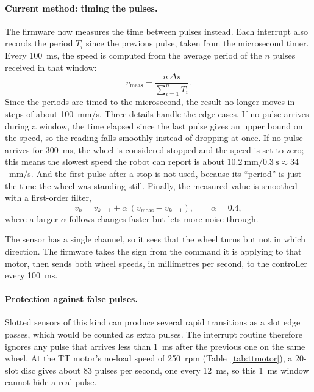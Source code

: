 \paragraph{Current method: timing the pulses.} The firmware now measures the time between
pulses instead. Each interrupt also records the period \(T_i\) since the previous pulse,
taken from the microsecond timer. Every 100~ms, the speed is computed from the average
period of the \(n\) pulses received in that window:
\begin{equation}
  v_{\text{meas}} = \frac{n \, \Delta s}{\sum_{i=1}^{n} T_i}.
\end{equation}
Since the periods are timed to the microsecond, the result no longer moves in steps of
about 100~mm/s. Three details handle the edge cases. If no pulse arrives during a window, the
time elapsed since the last pulse gives an upper bound on the speed, so the reading falls
smoothly instead of dropping at once. If no pulse arrives for 300~ms, the wheel is
considered stopped and the speed is set to zero; this means the slowest speed the robot
can report is about \(10.2~\text{mm} / 0.3~\text{s} \approx 34\)~mm/s. And the first
pulse after a stop is not used, because its ``period'' is just the time the wheel was
standing still. Finally, the measured value is smoothed with a first-order filter,
\begin{equation}
  v_k = v_{k-1} + \alpha \,(v_{\text{meas}} - v_{k-1}), \qquad \alpha = 0.4,
\end{equation}
where a larger \(\alpha\) follows changes faster but lets more noise through.

The sensor has a single channel, so it sees that the wheel turns but not in which
direction. The firmware takes the sign from the command it is applying to that motor,
then sends both wheel speeds, in millimetres per second, to the controller every 100~ms.

\paragraph{Protection against false pulses.} Slotted sensors of this kind can produce
several rapid transitions as a slot edge passes, which would be counted as extra pulses.
The interrupt routine therefore ignores any pulse that arrives less than 1~ms after the
previous one on the same wheel. At the TT motor's no-load speed of 250~rpm
(Table~\ref{tab:ttmotor}), a 20-slot disc gives about 83 pulses per second, one every
12~ms, so this 1~ms window cannot hide a real pulse.

